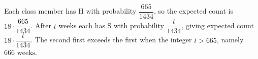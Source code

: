 Each class member has H with probability $\dfrac{665}{1434}$, so the expected count is $18\cdot\dfrac{665}{1434}$. After $t$ weeks each has S with probability $\dfrac{t}{1434}$, giving expected count $18\cdot\dfrac{t}{1434}$. The second first exceeds the first when the integer $t>665$, namely $\boxed{666\text{ weeks}}$.
